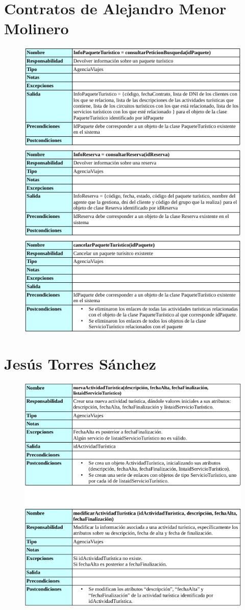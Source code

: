 \documentclass{article}
\begin{document}
	\section{Contratos de Alejandro Menor Molinero}
	\begin{figure}[H]
		\centering
		\includegraphics[totalheight=18cm]{pag1alex}
	\end{figure}
	
	
	\section{Jesús Torres Sánchez}
	\begin{figure}[H]
		\centering
		\includegraphics[totalheight=16cm]{pag1jesus}
	\end{figure}
	
\end{document}
